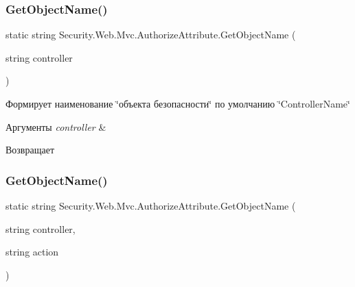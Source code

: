 \subsubsection{\texorpdfstring{Get\+Object\+Name()}{GetObjectName()}\hspace{0.1cm}{\footnotesize\ttfamily [1/2]}}
{\footnotesize\ttfamily static string Security.\+Web.\+Mvc.\+Authorize\+Attribute.\+Get\+Object\+Name (\begin{DoxyParamCaption}\item[{string}]{controller }\end{DoxyParamCaption})\hspace{0.3cm}{\ttfamily [static]}}



Формирует наименование \char`\"{}объекта безопасности\char`\"{} по умолчанию \char`\"{}\+Controller\+Name\char`\"{} 


\begin{DoxyParams}{Аргументы}
{\em controller} & \\
\hline
\end{DoxyParams}
\begin{DoxyReturn}{Возвращает}

\end{DoxyReturn}
\mbox{\label{class_security_1_1_web_1_1_mvc_1_1_authorize_attribute_a41f2910783bad96b5201ad207ffe5e1f}} 
\subsubsection{\texorpdfstring{Get\+Object\+Name()}{GetObjectName()}\hspace{0.1cm}{\footnotesize\ttfamily [2/2]}}
{\footnotesize\ttfamily static string Security.\+Web.\+Mvc.\+Authorize\+Attribute.\+Get\+Object\+Name (\begin{DoxyParamCaption}\item[{string}]{controller,  }\item[{string}]{action }\end{DoxyParamCaption})\hspace{0.3cm}{\ttfamily [static]}}



